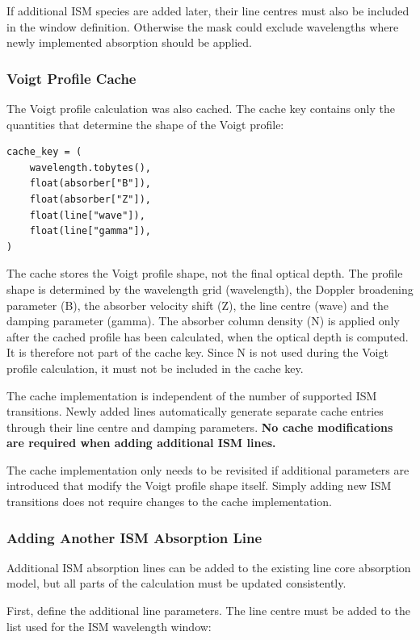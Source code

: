 If additional ISM species are added later, their line centres must also be included in the window definition. Otherwise the mask could exclude wavelengths where newly implemented absorption should be applied.

\subsubsection{Voigt Profile Cache}

The Voigt profile calculation was also cached. The cache key contains only the quantities that determine the shape of the Voigt profile:

\begin{verbatim}
cache_key = (
    wavelength.tobytes(),
    float(absorber["B"]),
    float(absorber["Z"]),
    float(line["wave"]),
    float(line["gamma"]),
)
\end{verbatim}

The cache stores the Voigt profile shape, not the final optical depth. The profile shape is determined by the wavelength grid (wavelength), the Doppler broadening parameter (B), the absorber velocity shift (Z), the line centre (wave) and the damping parameter (gamma). The absorber column density (N) is applied only after the cached profile has been calculated, when the optical depth is computed. It is therefore not part of the cache key.  Since N is not used during the Voigt profile calculation, it must not be included in the cache key.

The cache implementation is independent of the number of supported ISM transitions. Newly added lines automatically generate separate cache entries through their line centre and damping parameters. \textbf{No cache modifications are required when adding additional ISM lines.}

The cache implementation only needs to be revisited if additional parameters are introduced that modify the Voigt profile shape itself. Simply adding new ISM transitions does not require changes to the cache implementation.

\subsubsection{Adding Another ISM Absorption Line}
\label{sec:ism_absorption_optimisation}
Additional ISM absorption lines can be added to the existing line core absorption model, but all parts of the calculation must be updated consistently.

First, define the additional line parameters. The line centre must be added to the list used for the ISM wavelength window:


